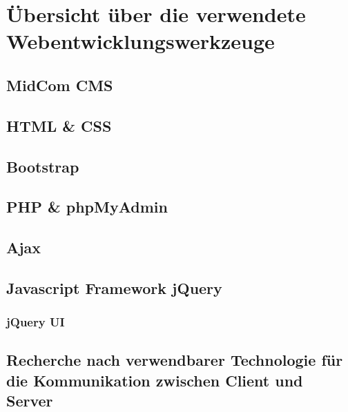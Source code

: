 \chapter{Übersicht über die verwendete Webentwicklungswerkzeuge}
\label{cha:webentwicklungswerkzeuge}


\section{MidCom CMS}
\label{sec:midCom cms}

\section{HTML \& CSS}
\label{sec:html und css}

\section{Bootstrap}
\label{sec:bootstrap}

\section{PHP \& phpMyAdmin}
\label{sec:php und phpMyAdmin}

\section{Ajax}
\label{sec:Ajax}

\section{Javascript Framework jQuery}
\label{sec:jquery}

\subsection{jQuery UI}

\section{Recherche nach verwendbarer Technologie für die Kommunikation zwischen Client und Server}
\label{sec:kommunikation zwischen client und server}

